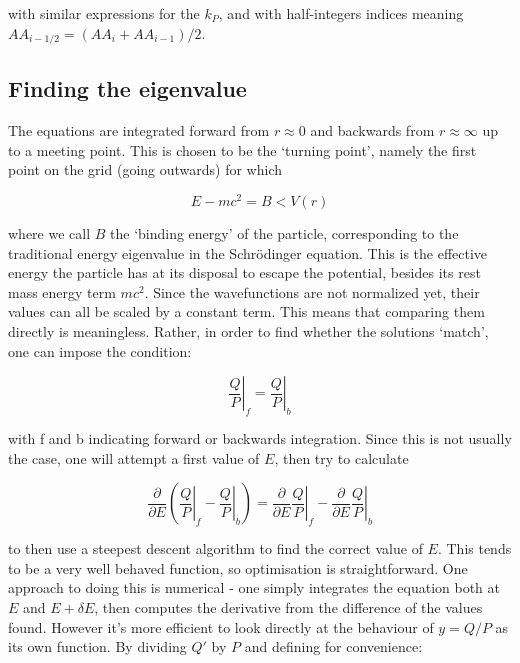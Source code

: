 \documentclass[]{report}
\begin{document}
with similar expressions for the $k_P$, and with half-integers indices meaning $AA_{i-1/2} = (AA_i+AA_{i-1})/2$.

\subsection{Finding the eigenvalue}

The equations are integrated forward from $r\approx0$ and backwards from $r\approx\infty$ up to a meeting point. This is chosen to be the `turning point', namely the first point on the grid (going outwards) for which

\begin{equation}
E-mc^2 = B < V(r)
\end{equation}

where we call $B$ the `binding energy' of the particle, corresponding to the traditional energy eigenvalue in the Schr\"{o}dinger equation. This is the effective energy the particle has at its disposal to escape the potential, besides its rest mass energy term $mc^2$.\newline
Since the wavefunctions are not normalized yet, their values can all be scaled by a constant term. This means that comparing them directly is meaningless. Rather, in order to find whether the solutions `match', one can impose the condition:

\begin{equation}
\left. \frac{Q}{P}\right|_f = \left. \frac{Q}{P}\right|_b
\end{equation}

with f and b indicating forward or backwards integration. Since this is not usually the case, one will attempt a first value of $E$, then try to calculate 

\begin{equation}
\frac{\partial}{\partial E}\left(\left. \frac{Q}{P}\right|_f - \left. \frac{Q}{P}\right|_b\right) = 
\frac{\partial}{\partial E}\left. \frac{Q}{P}\right|_f - \frac{\partial}{\partial E}\left. \frac{Q}{P}\right|_b
\end{equation}

to then use a steepest descent algorithm to find the correct value of $E$. This tends to be a very well behaved function, so optimisation is straightforward. One approach to doing this is numerical - one simply integrates the equation both at $E$ and $E+\delta E$, then computes the derivative from the difference of the values found. However it's more efficient to look directly at the behaviour of $y = Q/P$ as its own function. By dividing $Q'$ by $P$ and defining for convenience:
\end{document}
